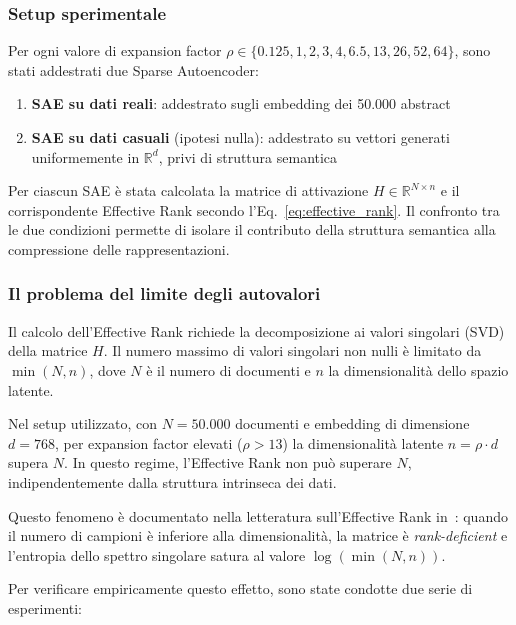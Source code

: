 \subsubsection{Setup sperimentale}
\label{subsubsec:er_setup}

Per ogni valore di expansion factor $\rho \in \{0.125, 1, 2, 3, 4, 6.5, 13, 26, 52, 64\}$, sono stati addestrati due Sparse Autoencoder:

\begin{enumerate}
    \item \textbf{SAE su dati reali}: addestrato sugli embedding dei 50.000 abstract
    \item \textbf{SAE su dati casuali} (ipotesi nulla): addestrato su vettori generati uniformemente in $\mathbb{R}^d$, privi di struttura semantica
\end{enumerate}

Per ciascun SAE è stata calcolata la matrice di attivazione $H \in \mathbb{R}^{N \times n}$ e il corrispondente Effective Rank secondo l'Eq.~\ref{eq:effective_rank}. Il confronto tra le due condizioni permette di isolare il contributo della struttura semantica alla compressione delle rappresentazioni.

\subsubsection{Il problema del limite degli autovalori}
\label{subsubsec:eigenvalue_limit}

Il calcolo dell'Effective Rank richiede la decomposizione ai valori singolari (SVD) della matrice $H$. Il numero massimo di valori singolari non nulli è limitato da $\min(N, n)$, dove $N$ è il numero di documenti e $n$ la dimensionalità dello spazio latente.

Nel setup utilizzato, con $N = 50.000$ documenti e embedding di dimensione $d = 768$, per expansion factor elevati ($\rho > 13$) la dimensionalità latente $n = \rho \cdot d$ supera $N$. In questo regime, l'Effective Rank non può superare $N$, indipendentemente dalla struttura intrinseca dei dati.

Questo fenomeno è documentato nella letteratura sull'Effective Rank in~\parencite{roy2007effective}: quando il numero di campioni è inferiore alla dimensionalità, la matrice è \textit{rank-deficient} e l'entropia dello spettro singolare satura al valore $\log(\min(N,n))$.

Per verificare empiricamente questo effetto, sono state condotte due serie di esperimenti:

